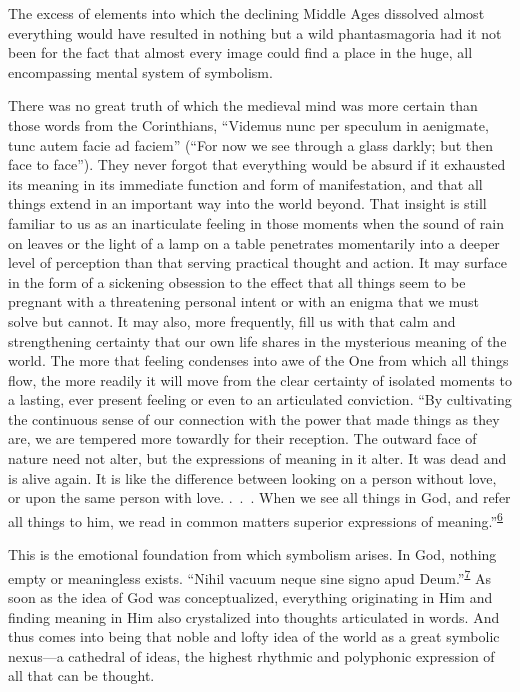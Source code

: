 The excess of elements into which the declining Middle Ages dissolved
almost everything would have resulted in nothing but a wild
phantasmagoria had it not been for the fact that almost every image
could find a place in the huge, all encompassing mental system of
symbolism.

There was no great truth of which the medieval mind was more certain
than those words from the Corinthians, ``Videmus nunc per speculum in
aenigmate, tunc autem facie ad faciem'' (``For now we see through a
glass darkly; but then face to face''). They never forgot that
everything would be absurd if it exhausted its meaning in its immediate
function and form of manifestation, and that all things extend in an
important way into the world beyond. That insight is still familiar to
us as an inarticulate feeling in those moments when the sound of rain on
leaves or the light of a lamp on a table penetrates momentarily into a
deeper level of perception than that serving practical thought and
action. It may surface in the form of a sickening obsession to the
effect that all things seem to be pregnant with a threatening personal
intent or with an enigma that we must solve but cannot. It may also,
more frequently, fill us with that calm and strengthening certainty that
our own life shares in the mysterious meaning of the world. The more
that feeling condenses into awe of the One from which all things flow,
the more readily it will move from the clear certainty of isolated
moments to a lasting, ever present feeling or even to an articulated
conviction. ``By cultivating the continuous sense of our connection with
the power that made things as they are, we are tempered more towardly
for their reception. The outward face of nature need not alter, but the
expressions of meaning in it alter. It was dead and is alive again. It
is like the difference between looking on a person without love, or upon
the same person with love. .~.~. When we see all things in God, and
refer all things to him, we read in common matters superior expressions
of
meaning.''\textsuperscript{\protect\hypertarget{16_Chapter_Nine__THE_DECLINE_OF_SYM.xhtmlux5cux23id_781}{\protect\hyperlink{23_NOTES.xhtmlux5cux23id_782}{6}}}

This is the emotional foundation from which symbolism arises. In God,
nothing empty or meaningless exists. ``Nihil vacuum neque sine signo
apud
Deum.''\textsuperscript{\protect\hypertarget{16_Chapter_Nine__THE_DECLINE_OF_SYM.xhtmlux5cux23id_779}{\protect\hyperlink{23_NOTES.xhtmlux5cux23id_780}{7}}}
As soon as the idea of God was conceptualized, everything originating in
Him and finding meaning in Him also crystalized into thoughts
articulated in words. And thus comes into being that noble and lofty
idea of the world as a
\protect\hypertarget{16_Chapter_Nine__THE_DECLINE_OF_SYM.xhtmlux5cux23page_236}{}{}great
symbolic nexus---a cathedral of ideas, the highest rhythmic and
polyphonic expression of all that can be thought.

